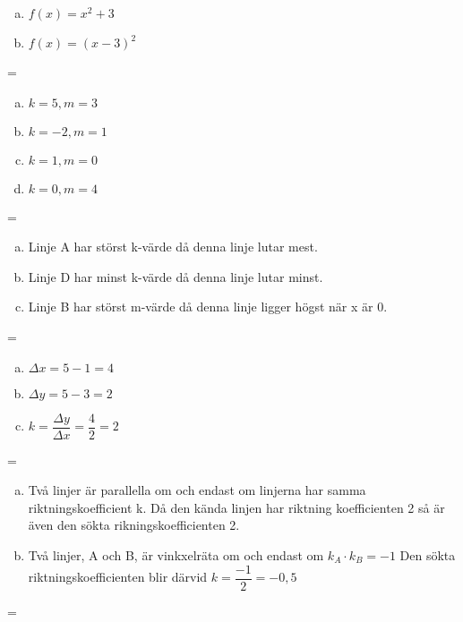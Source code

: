\documentclass {article}
\newenvironment{absolutelynopagebreak}
  {\par\nobreak\vfil\penalty0\vfilneg
   \vtop\bgroup}
  {\par\xdef\tpd{\the\prevdepth}\egroup
   \prevdepth=\tpd}
\begin{document}
\begin{absolutelynopagebreak}
\begin{enumerate}[a)]
\item $f(x) = x^2 + 3$
\item $f(x) = (x - 3)^2$
\end{enumerate}
\end{absolutelynopagebreak}

\begin{absolutelynopagebreak}
\begin{enumerate}[a)]
\item $k = 5, m = 3$
\item $k = -2, m = 1$
\item $k = 1, m = 0$
\item $k = 0, m = 4$
\end{enumerate}
\end{absolutelynopagebreak}

\begin{absolutelynopagebreak}
\begin{enumerate}[a)]
\item Linje A har störst k-värde då denna linje lutar mest.
\item Linje D har minst k-värde då denna linje lutar minst.
\item Linje B har störst m-värde då denna linje ligger högst när x är 0.
\end{enumerate}
\end{absolutelynopagebreak}

\begin{absolutelynopagebreak}
\begin{enumerate}[a)]
\item $\Delta x = 5 - 1 = 4$
\item $\Delta y = 5 - 3 = 2$
\item $k = \dfrac{\Delta y}{\Delta x} = \dfrac{4}{2} = 2$
\end{enumerate}
\end{absolutelynopagebreak}

\begin{absolutelynopagebreak}
\begin{enumerate}[a)]
\item Två linjer är parallella om och endast om linjerna har samma riktningskoefficient k. Då den kända linjen har riktning koefficienten 2 så 
är även den sökta rikningskoefficienten 2.
\item Två linjer, A och B, är vinkxelräta om och endast om $k_{A} \cdot k_{B} = -1$ Den sökta riktningskoefficienten blir därvid $ k = \dfrac{-1}{2} = -0,5$

\end{enumerate}
\end{absolutelynopagebreak}
\end{document}
